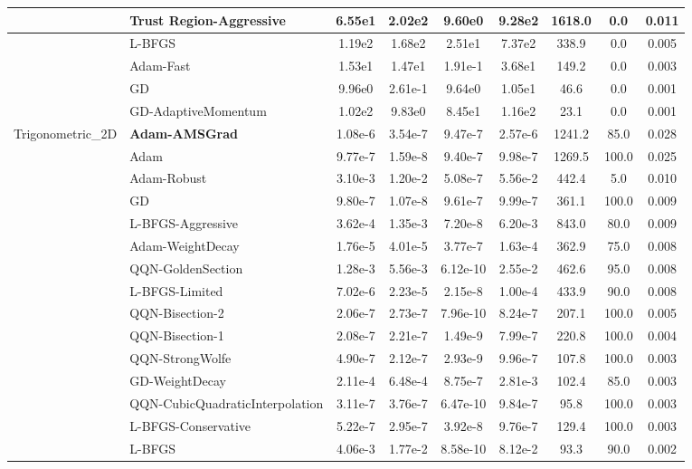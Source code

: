 \documentclass[10pt]{article}
\begin{document}
\begin{longtable}{|l|l|c|c|c|c|c|c|c|}
\hline
 & Trust Region-Aggressive & 6.55e1 & 2.02e2 & 9.60e0 & 9.28e2 & 1618.0 & 0.0 & 0.011 \\
\hline
 & L-BFGS & 1.19e2 & 1.68e2 & 2.51e1 & 7.37e2 & 338.9 & 0.0 & 0.005 \\
\hline
 & Adam-Fast & 1.53e1 & 1.47e1 & 1.91e-1 & 3.68e1 & 149.2 & 0.0 & 0.003 \\
\hline
 & GD & 9.96e0 & 2.61e-1 & 9.64e0 & 1.05e1 & 46.6 & 0.0 & 0.001 \\
\hline
 & GD-AdaptiveMomentum & 1.02e2 & 9.83e0 & 8.45e1 & 1.16e2 & 23.1 & 0.0 & 0.001 \\
Trigonometric\_2D & \textbf{Adam-AMSGrad} & 1.08e-6 & 3.54e-7 & 9.47e-7 & 2.57e-6 & 1241.2 & 85.0 & 0.028 \\
\hline
 & Adam & 9.77e-7 & 1.59e-8 & 9.40e-7 & 9.98e-7 & 1269.5 & 100.0 & 0.025 \\
\hline
 & Adam-Robust & 3.10e-3 & 1.20e-2 & 5.08e-7 & 5.56e-2 & 442.4 & 5.0 & 0.010 \\
\hline
 & GD & 9.80e-7 & 1.07e-8 & 9.61e-7 & 9.99e-7 & 361.1 & 100.0 & 0.009 \\
\hline
 & L-BFGS-Aggressive & 3.62e-4 & 1.35e-3 & 7.20e-8 & 6.20e-3 & 843.0 & 80.0 & 0.009 \\
\hline
 & Adam-WeightDecay & 1.76e-5 & 4.01e-5 & 3.77e-7 & 1.63e-4 & 362.9 & 75.0 & 0.008 \\
\hline
 & QQN-GoldenSection & 1.28e-3 & 5.56e-3 & 6.12e-10 & 2.55e-2 & 462.6 & 95.0 & 0.008 \\
\hline
 & L-BFGS-Limited & 7.02e-6 & 2.23e-5 & 2.15e-8 & 1.00e-4 & 433.9 & 90.0 & 0.008 \\
\hline
 & QQN-Bisection-2 & 2.06e-7 & 2.73e-7 & 7.96e-10 & 8.24e-7 & 207.1 & 100.0 & 0.005 \\
\hline
 & QQN-Bisection-1 & 2.08e-7 & 2.21e-7 & 1.49e-9 & 7.99e-7 & 220.8 & 100.0 & 0.004 \\
\hline
 & QQN-StrongWolfe & 4.90e-7 & 2.12e-7 & 2.93e-9 & 9.96e-7 & 107.8 & 100.0 & 0.003 \\
\hline
 & GD-WeightDecay & 2.11e-4 & 6.48e-4 & 8.75e-7 & 2.81e-3 & 102.4 & 85.0 & 0.003 \\
\hline
 & QQN-CubicQuadraticInterpolation & 3.11e-7 & 3.76e-7 & 6.47e-10 & 9.84e-7 & 95.8 & 100.0 & 0.003 \\
\hline
 & L-BFGS-Conservative & 5.22e-7 & 2.95e-7 & 3.92e-8 & 9.76e-7 & 129.4 & 100.0 & 0.003 \\
\hline
 & L-BFGS & 4.06e-3 & 1.77e-2 & 8.58e-10 & 8.12e-2 & 93.3 & 90.0 & 0.002 \\

\end{longtable}
\end{document}
